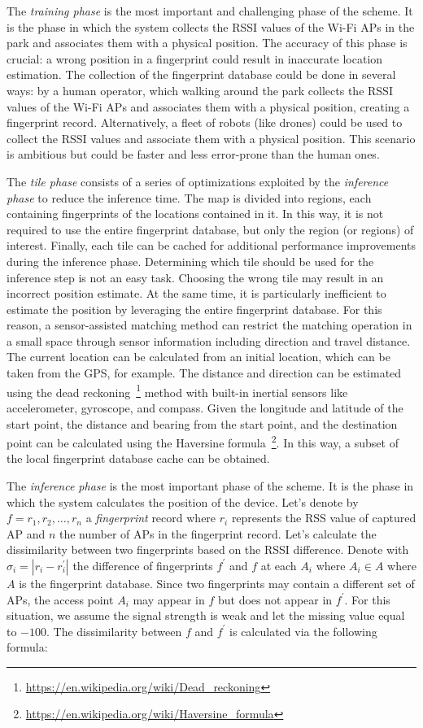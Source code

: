 The \textit{training phase} is the most important and challenging phase of the scheme. It is the phase in which the system collects the RSSI values
of the Wi-Fi APs in the park and associates them with a physical position. The accuracy of this phase is crucial: a wrong position in a fingerprint
could result in inaccurate location estimation. The collection of the fingerprint database could be done in several ways: by a human operator, which
walking around the park collects the RSSI values of the Wi-Fi APs and associates them with a physical position, creating a fingerprint record.
Alternatively, a fleet of robots (like drones) could be used to collect the RSSI values and associate them with a physical position. This scenario
is ambitious but could be faster and less error-prone than the human ones.

The \textit{tile phase} consists of a series of optimizations exploited by the \textit{inference phase} to reduce the inference time.
The map is divided into regions, each containing fingerprints of the locations contained in it.
In this way, it is not required to use the entire fingerprint database, but only the region (or regions) of interest.
Finally, each tile can be cached for additional performance improvements during the inference phase.
Determining which tile should be used for the inference step is not an easy task. Choosing the wrong tile may result in an incorrect
position estimate. At the same time, it is particularly inefficient to estimate the position by leveraging the entire fingerprint database.
For this reason, a sensor-assisted matching method can restrict the matching operation in a small space through sensor information including
direction and travel distance. The current location can be calculated from an initial location, which can be taken from the GPS, for example.
The distance and direction can be estimated using the dead reckoning~\footnote{\url{https://en.wikipedia.org/wiki/Dead_reckoning}} method with
built-in inertial sensors like accelerometer, gyroscope, and compass.
Given the longitude and latitude of the start point, the distance and bearing from the start point, and the destination point can be calculated using
the Haversine formula~\footnote{\url{https://en.wikipedia.org/wiki/Haversine_formula}}. In this way, a subset of the local fingerprint database cache
can be obtained.

The \textit{inference phase} is the most important phase of the scheme. It is the phase in which the system calculates the position of the device.
Let's denote by $f = {r_1, r_2, \ldots, r_n}$ a \textit{fingerprint} record where $r_i$ represents the RSS value of captured AP and $n$ the number of
APs in the fingerprint record.
Let's calculate the dissimilarity between two fingerprints based on the RSSI difference.
Denote with $\sigma_i = | r_i - r^{'}_{i}|$ the difference of fingerprints $f^{'}$ and $f$ at each $A_i$ where $A_i \in A$ where $A$ is the
fingerprint database.
Since two fingerprints may contain a different set of APs, the access point $A_i$ may appear in $f$ but does not appear in $f^{'}$.
For this situation, we assume the signal strength is weak and let the missing value equal to $-100$.
The dissimilarity between $f$ and $f^{'}$ is calculated via the following formula:

